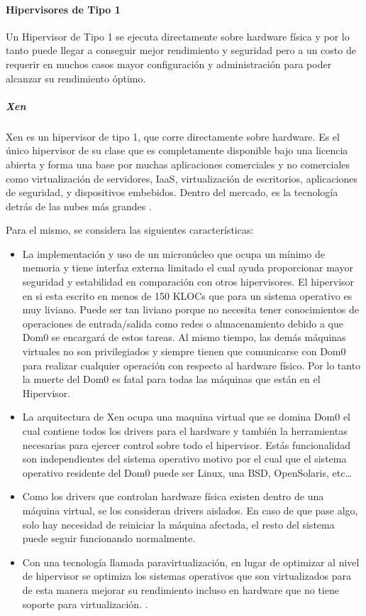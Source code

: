 \paragraph{Hipervisores de Tipo 1}
Un Hipervisor de Tipo 1 se ejecuta directamente sobre hardware física \citep{IBM-Hypervisors} y por lo tanto puede llegar a conseguir mejor rendimiento y seguridad pero a un costo de requerir en muchos casos mayor configuración y administración para poder alcanzar su rendimiento óptimo.

\subparagraph{Xen}
Xen es un hipervisor de tipo 1, que corre directamente sobre hardware. Es el único hipervisor de su clase que es completamente disponible bajo una licencia abierta y forma una base por muchas aplicaciones comerciales y no comerciales como virtualización de servidores, IaaS, virtualización de escritorios, aplicaciones de seguridad, y dispositivos embebidos. Dentro del mercado, es la tecnología detrás de las nubes más grandes \citep{Xen-Project-Overview}.
 
Para el mismo, se considera las siguientes características:
\begin{itemize}
	\item La implementación y uso de un micronúcleo que ocupa un mínimo de memoria y tiene interfaz externa limitado el cual ayuda proporcionar mayor seguridad y estabilidad en comparación con otros hipervisores. El hipervisor en si esta escrito en menos de 150 KLOCs que para un sistema operativo es muy liviano. Puede ser tan liviano porque no necesita tener conocimientos de operaciones de entrada/salida como redes o almacenamiento debido a que Dom0 se encargará de estos tareas. Al mismo tiempo, las demás máquinas virtuales no son privilegiados y siempre tienen que comunicarse con Dom0 para realizar cualquier operación con respecto al hardware físico. Por lo tanto la muerte del Dom0 es fatal para todas las máquinas que están en el Hipervisor.
    \item La arquitectura de Xen ocupa una maquina virtual que se domina Dom0 el cual contiene todos los drivers para el hardware y también la herramientas necesarias para ejercer control sobre todo el hipervisor. Estás funcionalidad son independientes del sistema operativo motivo por el cual que el sistema operativo residente del Dom0 puede ser Linux, una BSD, OpenSolaris, etc\ldots
    \item Como los drivers que controlan hardware física existen dentro de una máquina virtual, se los consideran drivers aislados. En caso de que pase algo, solo hay necesidad de reiniciar la máquina afectada, el resto del sistema puede seguir funcionando normalmente.
    \item Con una tecnología llamada paravirtualización, en lugar de optimizar al nivel de hipervisor se optimiza los sistemas operativos que son virtualizados para de esta manera mejorar su rendimiento incluso en hardware que no tiene soporte para virtualización. \citep{Xen-Project-Overview}.
\end{itemize}

